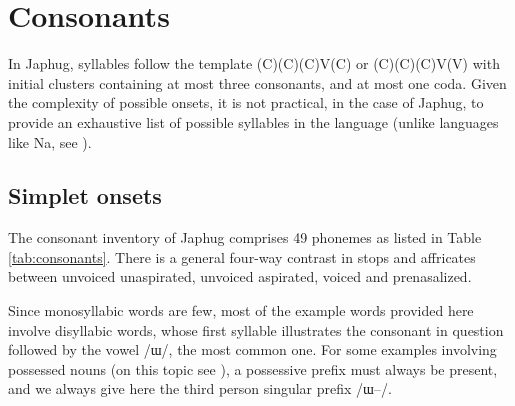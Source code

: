 \documentclass[oldfontcommands,oneside,a4paper,11pt]{article}
\newcommand{\ipa}[1]{/#1/} %
\begin{document}
 
 \section{Consonants}
 In Japhug, syllables follow the template (C)(C)(C)V(C) or (C)(C)(C)V(V) with initial clusters containing at most three consonants, and at most one coda. Given the complexity of possible onsets, it is not practical, in the case of Japhug, to provide an exhaustive list of possible syllables in the language (unlike languages like Na, see \citealt{boydalexis06}).
 
 \subsection{Simplet onsets} \label{sec:simple}
 The consonant inventory of Japhug comprises 49 phonemes as listed in Table \ref{tab:consonants}. There is a general four-way contrast in stops and affricates between unvoiced unaspirated, unvoiced aspirated, voiced and prenasalized.
 
Since monosyllabic words are few,  most of the example words provided here involve disyllabic words, whose first syllable illustrates the consonant in question followed by the vowel \ipa{ɯ}, the most common one. For some examples involving possessed nouns (on this topic see \citealt[6]{jacques14antipassive}), a possessive prefix must always be present, and we always give here the third person singular prefix  \ipa{ɯ--}.
 
 \begin{table}
 \caption{Consonantal phonemes in Japhug Rgyalrong} \label{tab:consonants}  \centering
\end{table}
\end{document}
